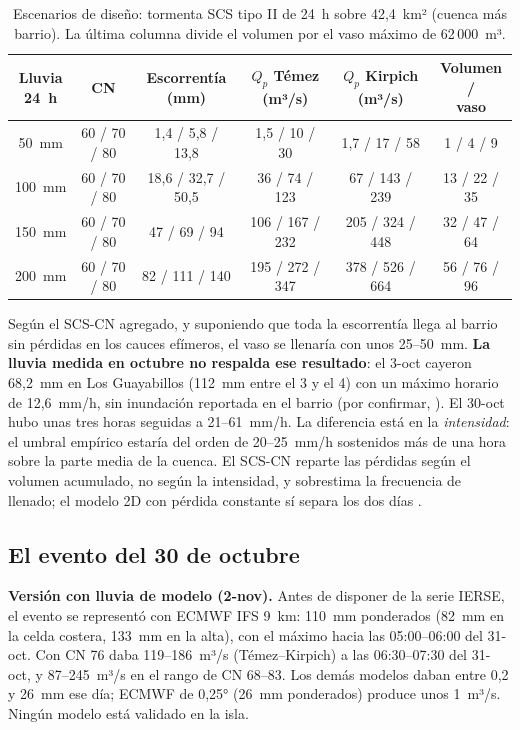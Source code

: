 \documentclass{sosg-informe}
\begin{document}
\begin{table}[ht]
  \centering\small
  \caption{Escenarios de diseño: tormenta SCS tipo II de 24~h sobre 42,4~km² (cuenca más barrio). La última columna divide el volumen por el vaso máximo de 62\,000~m³.}
  \label{tab:diseno}
  \begin{tabular}{cccccc}
    \toprule
    \makecell{Lluvia\\24~h} & CN & \makecell{Escorrentía\\(mm)} & \makecell{$Q_p$ Témez\\(m³/s)} & \makecell{$Q_p$ Kirpich\\(m³/s)} & \makecell{Volumen /\\vaso} \\
    \midrule
    50~mm & 60 / 70 / 80 & 1,4 / 5,8 / 13,8 & 1,5 / 10 / 30 & 1,7 / 17 / 58 & 1 / 4 / 9 \\
    100~mm & 60 / 70 / 80 & 18,6 / 32,7 / 50,5 & 36 / 74 / 123 & 67 / 143 / 239 & 13 / 22 / 35 \\
    150~mm & 60 / 70 / 80 & 47 / 69 / 94 & 106 / 167 / 232 & 205 / 324 / 448 & 32 / 47 / 64 \\
    200~mm & 60 / 70 / 80 & 82 / 111 / 140 & 195 / 272 / 347 & 378 / 526 / 664 & 56 / 76 / 96 \\
    \bottomrule
  \end{tabular}
\end{table}

Según el SCS-CN agregado, y suponiendo que toda la escorrentía llega al barrio sin pérdidas en los cauces efímeros, el vaso se llenaría con unos 25--50~mm. \textbf{La lluvia medida en octubre no respalda ese resultado}: el 3-oct cayeron 68,2~mm en Los Guayabillos (112~mm entre el 3 y el 4) con un máximo horario de 12,6~mm/h, sin inundación reportada en el barrio (por confirmar, ). El 30-oct hubo unas tres horas seguidas a 21--61~mm/h. La diferencia está en la \emph{intensidad}: el umbral empírico estaría del orden de 20--25~mm/h sostenidos más de una hora sobre la parte media de la cuenca. El SCS-CN reparte las pérdidas según el volumen acumulado, no según la intensidad, y sobrestima la frecuencia de llenado; el modelo 2D con pérdida constante sí separa los dos días \citep{sosg202606}.

\subsection{El evento del 30 de octubre}
\textbf{Versión con lluvia de modelo (2-nov).} Antes de disponer de la serie IERSE, el evento se representó con ECMWF IFS 9~km: 110~mm ponderados (82~mm en la celda costera, 133~mm en la alta), con el máximo hacia las 05:00--06:00 del 31-oct. Con CN 76 daba 119--186~m³/s (Témez--Kirpich) a las 06:30--07:30 del 31-oct, y 87--245~m³/s en el rango de CN 68--83. Los demás modelos daban entre 0,2 y 26~mm ese día; ECMWF de 0,25° (26~mm ponderados) produce unos 1~m³/s. Ningún modelo está validado en la isla.
\end{document}
